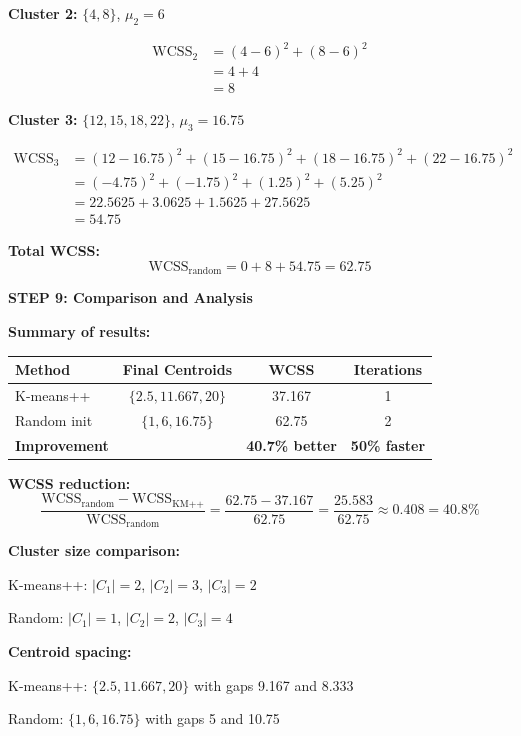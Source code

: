 \documentclass[12pt]{article}
\begin{document}
\begin{solution}
\textbf{Cluster 2:} $\{4, 8\}$, $\mu_2 = 6$

\begin{align*}
\text{WCSS}_2 &= (4 - 6)^2 + (8 - 6)^2 \\
&= 4 + 4 \\
&= 8
\end{align*}

\textbf{Cluster 3:} $\{12, 15, 18, 22\}$, $\mu_3 = 16.75$

\begin{align*}
\text{WCSS}_3 &= (12 - 16.75)^2 + (15 - 16.75)^2 + (18 - 16.75)^2 + (22 - 16.75)^2 \\
&= (-4.75)^2 + (-1.75)^2 + (1.25)^2 + (5.25)^2 \\
&= 22.5625 + 3.0625 + 1.5625 + 27.5625 \\
&= 54.75
\end{align*}

\textbf{Total WCSS:}
\[
\text{WCSS}_{\text{random}} = 0 + 8 + 54.75 = 62.75
\]

\textbf{STEP 9: Comparison and Analysis}

\textbf{Summary of results:}

\begin{center}
\begin{tabular}{l|c|c|c}
\textbf{Method} & \textbf{Final Centroids} & \textbf{WCSS} & \textbf{Iterations} \\
\hline
K-means++ & $\{2.5, 11.667, 20\}$ & 37.167 & 1 \\
Random init & $\{1, 6, 16.75\}$ & 62.75 & 2 \\
\hline
\textbf{Improvement} & & \textbf{40.7\% better} & \textbf{50\% faster} \\
\end{tabular}
\end{center}

\textbf{WCSS reduction:}
\[
\frac{\text{WCSS}_{\text{random}} - \text{WCSS}_{\text{KM++}}}{\text{WCSS}_{\text{random}}} = \frac{62.75 - 37.167}{62.75} = \frac{25.583}{62.75} \approx 0.408 = 40.8\%
\]

\textbf{Cluster size comparison:}

K-means++: $|C_1| = 2$, $|C_2| = 3$, $|C_3| = 2$

Random: $|C_1| = 1$, $|C_2| = 2$, $|C_3| = 4$

\textbf{Centroid spacing:}

K-means++: $\{2.5, 11.667, 20\}$ with gaps 9.167 and 8.333

Random: $\{1, 6, 16.75\}$ with gaps 5 and 10.75


\end{solution}
\end{document}
